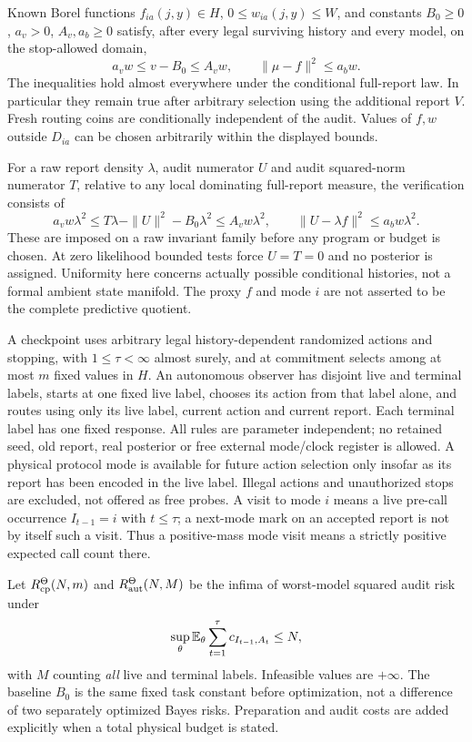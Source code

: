 \begin{definition}\label{def:calibration}
Known Borel functions $f_{ia}(j,y)\in H$, $0\le w_{ia}(j,y)\le W$, and constants $B_0\ge0$, $a_v>0$, $A_v,a_b\ge0$ satisfy, after every legal surviving history and every model, on the stop-allowed domain,
\begin{equation}\label{eq:calibration}
 a_vw\le v-B_0\le A_vw,\qquad
 \|\mu-f\|^2\le a_bw.
\end{equation}
The inequalities hold almost everywhere under the conditional full-report law. In particular they remain true after arbitrary selection using the additional report $V$. Fresh routing coins are conditionally independent of the audit. Values of $f,w$ outside $D_{ia}$ can be chosen arbitrarily within the displayed bounds.
\end{definition}

For a raw report density $\lambda$, audit numerator $U$ and audit squared-norm numerator $T$, relative to any local dominating full-report measure, the verification consists of
\[
 a_vw\lambda^2\le T\lambda-\|U\|^2-B_0\lambda^2
       \le A_vw\lambda^2,\qquad
 \|U-\lambda f\|^2\le a_bw\lambda^2.
\]
These are imposed on a raw invariant family before any program or budget is chosen. At zero likelihood bounded tests force $U=T=0$ and no posterior is assigned. Uniformity here concerns actually possible conditional histories, not a formal ambient state manifold. The proxy $f$ and mode $i$ are not asserted to be the complete predictive quotient.

A checkpoint uses arbitrary legal history-dependent randomized actions and stopping, with $1\le\tau<\infty$ almost surely, and at commitment selects among at most $m$ fixed values in $H$. An autonomous observer has disjoint live and terminal labels, starts at one fixed live label, chooses its action from that label alone, and routes using only its live label, current action and current report. Each terminal label has one fixed response. All rules are parameter independent; no retained seed, old report, real posterior or free external mode/clock register is allowed. A physical protocol mode is available for future action selection only insofar as its report has been encoded in the live label. Illegal actions and unauthorized stops are excluded, not offered as free probes. A visit to mode $i$ means a live pre-call occurrence $I_{t-1}=i$ with $t\le\tau$; a next-mode mark on an accepted report is not by itself such a visit. Thus a positive-mass mode visit means a strictly positive expected call count there.

Let $R_{\mathrm{cp}}^\Theta(N,m)$ and $R_{\mathrm{aut}}^\Theta(N,M)$ be the infima of worst-model squared audit risk under
\begin{equation}\label{eq:budget}
 \sup_{\theta}\mathbb E_\theta\sum_{t=1}^{\tau}c_{I_{t-1},A_t}\le N,
\end{equation}
with $M$ counting \emph{all} live and terminal labels. Infeasible values are $+\infty$. The baseline $B_0$ is the same fixed task constant before optimization, not a difference of two separately optimized Bayes risks. Preparation and audit costs are added explicitly when a total physical budget is stated.
